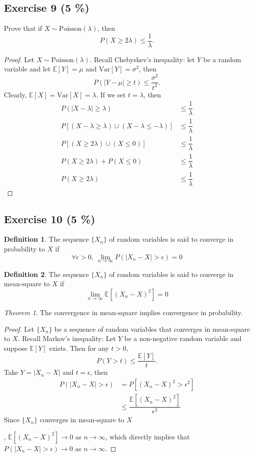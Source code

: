 \documentclass[11pt]{article}
\theoremstyle{definition}
\newtheorem{definition}{Definition}[section]
\theoremstyle{remark}
\theoremstyle{remark}
\newtheorem{theorem}{Theorem}[section]
\newcommand{\E}[1]{\mathbb{E}\left[#1 \right]}
\newcommand{\V}[1]{\mathrm{Var}\left[#1 \right]}
\begin{document}
\subsection*{Exercise 9 (5 \%)}
Prove that if $X\sim \mathrm{Poisson}(\lambda)$, then
\[
  P(X\geq 2\lambda)\leq \dfrac{1}{\lambda}.
\]
\begin{proof}
  Let $X\sim \mathrm{Poisson}(\lambda)$. Recall Chebyshev's
  inequality: let $Y$ be a random variable and let $\E{Y}=\mu$ and
  $\V{Y}=\sigma^2$, then
\[
  P(|Y-\mu|\geq t)\leq\dfrac{\sigma^2}{t^2}.
\]
Clearly, $\E{X}=\V{X}=\lambda$. If we set $t=\lambda$, then
\[
\begin{split}
  P(|X-\lambda|\geq\lambda)&\leq\dfrac{1}{\lambda}\\
  P\left[(X-\lambda\geq\lambda)\cup(X-\lambda\leq-\lambda)\right]&\leq\dfrac{1}{\lambda}\\
  P\left[(X\geq2\lambda)\cup(X\leq0)\right]&\leq\dfrac{1}{\lambda}\\
  P(X\geq2\lambda)+P(X\leq0)&\leq\dfrac{1}{\lambda}\\
  P(X\geq 2\lambda)&\leq \dfrac{1}{\lambda}
\end{split}
\]
\end{proof}

\subsection*{Exercise 10 (5 \%)}
\begin{definition}
  The sequence $\{X_n\}$ of random variables is said to converge in
  probability to $X$ if
\[
\forall\epsilon>0, \ \lim_{n\rightarrow\infty}P\left(|X_n-X|>\epsilon\right)=0
\]
\end{definition}

\begin{definition}
  The sequence $\{X_n\}$ of random variables is said to converge in
  mean-square to $X$ if
\[
  \lim_{n\rightarrow\infty}\E{(X_n-X)^2}=0
\]
\end{definition}
\begin{theorem}
  The convergence in mean-square implies convergence in probability.
\end{theorem}

\begin{proof}
  Let $\{X_n\}$ be a sequence of random variables that converges in
  mean-square to $X$. Recall Markov's inequality: Let $Y$ be a
  non-negative random variable and suppose $\E{Y}$ exists. Then for
  any $t>0$,
\[
  P(Y>t) \leq \dfrac{\E{Y}}{t}.
\]
Take $Y=|X_n-X|$ and $t=\epsilon$, then
\[
\begin{split}
  P(|X_n-X|>\epsilon) &= P\left[(X_n-X)^2>\epsilon^2\right]\\
  & \leq \dfrac{\E{(X_n-X)^2}}{\epsilon^2}
\end{split}
\]
Since $\{X_n\}$ converges in mean-square to $X$

, $\E{(X_n-X)^2}\rightarrow0$ as $n\rightarrow\infty$, which directly
implies that $P(|X_n-X|>\epsilon)\rightarrow0$ as
$n\rightarrow\infty$.
\end{proof}
\end{document}
